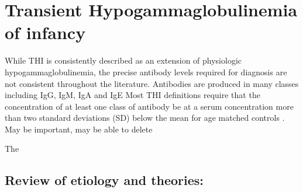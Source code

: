 \documentclass[12pt]{article}
\begin{document}
	
	\section{Transient Hypogammaglobulinemia of infancy}
	
	While THI is consistently described as an extension of physiologic hypogammaglobulinemia, the precise antibody levels required for diagnosis are not consistent throughout the literature. 
	Antibodies are produced in many classes including IgG, IgM, IgA and IgE \citep{Cooper15}
	Most THI definitions require that the concentration of at least one class of antibody be at a serum concentration more than two standard deviations (SD) below the mean for age matched controls \citep{Tiller78,McGeady87,Dressler89,Dalal98}. 
	{\Huge May be important, may be able to delete}
	
	The 
	
	\subsection{Review of etiology and theories: \citeauthor{Ovadia14} \citeyear{Ovadia14}}
	
\end{document}
